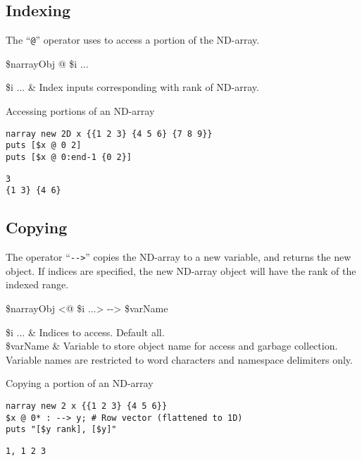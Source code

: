 \clearpage
\subsection{Indexing}
The ``\texttt{@}'' operator uses  to access a portion of the ND-array. 
\begin{syntax}
 \$narrayObj @ \$i ...
\end{syntax}
\begin{args}
\$i ... & Index inputs corresponding with rank of ND-array. \\
\end{args}

\begin{example}{Accessing portions of an ND-array}
\begin{lstlisting}
narray new 2D x {{1 2 3} {4 5 6} {7 8 9}}
puts [$x @ 0 2]
puts [$x @ 0:end-1 {0 2}]
\end{lstlisting}
\tcblower
\begin{lstlisting}
3
{1 3} {4 6}
\end{lstlisting}
\end{example}

\subsection{Copying}
The operator ``\texttt{-{}->}'' copies the ND-array to a new variable, and returns the new object.
If indices are specified, the new ND-array object will have the rank of the indexed range.
\begin{syntax}
 \$narrayObj <@ \$i ...> -{}-> \$varName
\end{syntax}
\begin{args}
\$i ... & Indices to access. Default all. \\
\$varName & Variable to store object name for access and garbage collection. 
Variable names are restricted to word characters and namespace delimiters only.
\end{args}

\begin{example}{Copying a portion of an ND-array}
\begin{lstlisting}
narray new 2 x {{1 2 3} {4 5 6}}
$x @ 0* : --> y; # Row vector (flattened to 1D)
puts "[$y rank], [$y]"
\end{lstlisting} 
\tcblower
\begin{lstlisting}
1, 1 2 3
\end{lstlisting}
\end{example}
\clearpage
